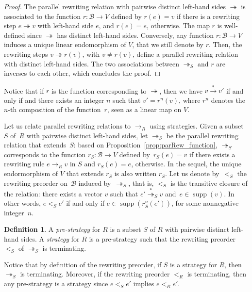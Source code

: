 \documentclass[11pt]{article}
\theoremstyle{definition}
\newtheorem{definition}[theorem]{Definition}
\newcommand\basis{\mathscr{B}}
\newcommand\ordS{<_S}
\DeclareMathOperator{\supp}{supp}
\newcommand\rewR{\to_R}
\newcommand\parRew{\twoheadrightarrow}
\newcommand\parS{\twoheadrightarrow_S}
\newcommand\transRew{\overset{*}{\to}}
\newcommand\transParS{\overset{*}{\twoheadrightarrow}_S}
\begin{document}
\begin{proof}
  The parallel rewriting relation with pairwise distinct left-hand sides
  $\parRew$ is associated to the function $r:\basis\to V$ defined by
  $r(e)=v$ if there is a rewriting step $e\parRew v$ with left-hand side
  $e$, and $r(e)=e$, otherwise. The map $r$ is well-defined since
  $\parRew$ has distinct left-hand sides. Conversely, any function 
  $r:\basis\to V$ induces a unique linear endomorphism of $V$, that we
  still denote by $r$. Then, the rewriting steps $v\parRew r(v)$, with
  $v\neq r(v)$, define a parallel rewriting relation with distinct
  left-hand sides. The two associations between $\parS$ and $r$ are
  inverses to each other, which concludes the proof. 
\end{proof}

Notice that if $r$ is the function corresponding to $\parRew$, then we
have $v\transRew v'$ if and only if and there exists an integer $n$ such
that $v'=r^n(v)$, where $r^n$ denotes the $n$-th composition of the
function~$r$, seen as a linear map on $V$. 
\medskip

Let us relate parallel rewriting relations to $\rewR$ using strategies.
Given a subset~$S$ of~$R$ with pairwise distinct left-hand sides, let
$\parS$ be the parallel rewriting relation that extends~$S$: based on 
Proposition~\ref{prop:parRew_function}, $\parS$ corresponds to the
function $r_S:\basis\to V$ defined by~$r_S(e)=v$ if there exists a
rewriting rule $e\rewR v$ in $S$ and $r_S(e)=e$, otherwise. In the
sequel, the unique endormorphism of $V$ that extends $r_S$ is also
written $r_S$. Let us denote by~$\ordS$ the rewriting preorder
on~$\basis$ induced by~$\parS$, that is, $\ordS$ is the transitive
closure of the relation: there exists a vector $v$ such that
$e'\transParS v$ and~$e\in\supp(v)$. In other words, $e\ordS e'$ if and
only if $e\in\supp(r_S^n(e'))$, for some nonnegative integer~$n$.
\smallskip

\begin{definition}\label{def:strategies}
  A {\em pre-strategy} for $R$ is a subset $S$ of $R$ with pairwise
  distinct left-hand sides. A {\em strategy} for $R$ is a pre-strategy
  such that the rewriting preorder $\ordS$ of $\parS$ is terminating. 
\end{definition}
\smallskip

Notice that by definition of the rewriting preorder, if $S$ is a strategy
for $R$, then $\parS$ is terminating. Moreover, if the rewriting preorder
$<_R$ is terminating, then any pre-strategy is a strategy since
$e\ordS e'$ implies $e<_Re'$.
\smallskip
\end{document}
